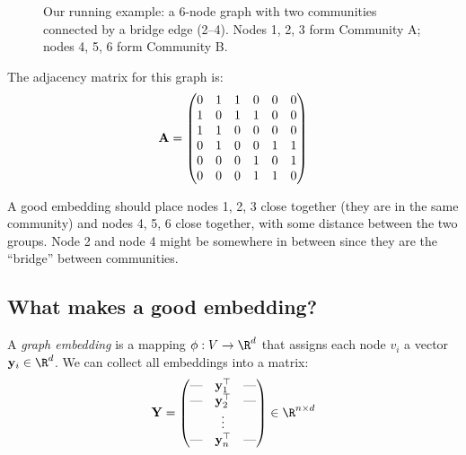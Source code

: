 \begin{notechapter}
\begin{figure}[htbp]
\caption{Our running example: a 6-node graph with two communities connected by a bridge edge (2--4). Nodes 1, 2, 3 form Community A; nodes 4, 5, 6 form Community B.}
\label{shallow-embeddings:fig:running_example}
\end{figure}

The adjacency matrix for this graph is:
\begin{equation}
\mathbf{A} = \begin{pmatrix}
0 & 1 & 1 & 0 & 0 & 0 \\
1 & 0 & 1 & 1 & 0 & 0 \\
1 & 1 & 0 & 0 & 0 & 0 \\
0 & 1 & 0 & 0 & 1 & 1 \\
0 & 0 & 0 & 1 & 0 & 1 \\
0 & 0 & 0 & 1 & 1 & 0
\end{pmatrix}
\label{shallow-embeddings:eq:adj_matrix}
\end{equation}

\begin{intuition}
A good embedding should place nodes 1, 2, 3 close together (they are in the same community) and nodes 4, 5, 6 close together, with some distance between the two groups. Node 2 and node 4 might be somewhere in between since they are the ``bridge'' between communities.
\end{intuition}

\subsection{What makes a good embedding?}

\begin{definition}
A \emph{graph embedding} is a mapping $\phi: V \to \R^d$ that assigns each node $v_i$ a vector $\vect{y}_i \in \R^d$. We can collect all embeddings into a matrix:
\[
\embed = \begin{pmatrix} \text{---} & \vect{y}_1^\top & \text{---} \\ \text{---} & \vect{y}_2^\top & \text{---} \\ & \vdots & \\ \text{---} & \vect{y}_n^\top & \text{---} \end{pmatrix} \in \R^{n \times d}
\]
\end{definition}


\end{notechapter}
